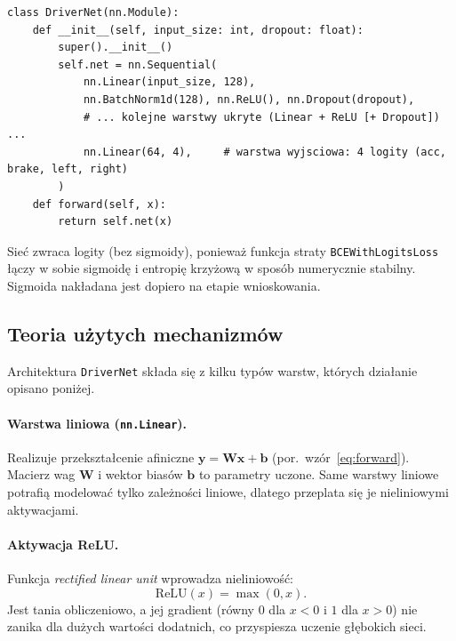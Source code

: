 \documentclass[11pt,a4paper]{article}
\begin{document}
\noindent\begin{minipage}{\linewidth}
\begin{lstlisting}[style=py,caption={Architektura sieci \texttt{DriverNet} (fragment \texttt{grid\_search\_driver\_basic.py}). Liczba i rozmiary warstw ukrytych są strojonym hiperparametrem.}]
class DriverNet(nn.Module):
    def __init__(self, input_size: int, dropout: float):
        super().__init__()
        self.net = nn.Sequential(
            nn.Linear(input_size, 128),
            nn.BatchNorm1d(128), nn.ReLU(), nn.Dropout(dropout),
            # ... kolejne warstwy ukryte (Linear + ReLU [+ Dropout]) ...
            nn.Linear(64, 4),     # warstwa wyjsciowa: 4 logity (acc, brake, left, right)
        )
    def forward(self, x):
        return self.net(x)
\end{lstlisting}
\end{minipage}

Sieć zwraca logity (bez sigmoidy), ponieważ funkcja straty
\texttt{BCE\allowbreak WithLogitsLoss} łączy w sobie sigmoidę i entropię krzyżową
w sposób numerycznie stabilny. Sigmoida nakładana jest dopiero na etapie wnioskowania.

\subsection{Teoria użytych mechanizmów}
\label{sec:teoria-warstw}

Architektura \texttt{DriverNet} składa się z kilku typów warstw, których działanie
opisano poniżej.

\paragraph{Warstwa liniowa (\texttt{nn.Linear}).}
Realizuje przekształcenie afiniczne $\mathbf{y} = \mathbf{W}\mathbf{x} + \mathbf{b}$
(por.\ wzór~\eqref{eq:forward}). Macierz wag $\mathbf{W}$ i wektor biasów
$\mathbf{b}$ to parametry uczone. Same warstwy liniowe potrafią modelować tylko
zależności liniowe, dlatego przeplata się je nieliniowymi aktywacjami.

\paragraph{Aktywacja ReLU.}
Funkcja \emph{rectified linear unit} wprowadza nieliniowość:
\begin{equation}
\mathrm{ReLU}(x) = \max(0, x).
\label{eq:relu}
\end{equation}
Jest tania obliczeniowo, a jej gradient (równy $0$ dla $x<0$ i $1$ dla $x>0$)
nie zanika dla dużych wartości dodatnich, co przyspiesza uczenie głębokich sieci.
\end{document}
